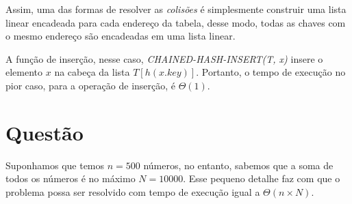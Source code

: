 \documentclass[a4paper,12pt]{article}
\begin{document}
Assim, uma das formas de resolver as \textit{colisões} é simplesmente construir uma lista linear encadeada para cada endereço da tabela, desse modo, todas as chaves com o mesmo endereço são encadeadas em uma lista linear.

A função de inserção, nesse caso, \textit{CHAINED-HASH-INSERT(T, x)} insere o elemento $x$ na cabeça da lista $T[h(x.key)]$. Portanto, o tempo de execução no pior caso, para a operação de inserção, é $\Theta(1)$.

\section{Questão}


Suponhamos que temos $n = 500$ números, no entanto, sabemos que a soma de todos os números é no máximo $N = 10000$. Esse pequeno detalhe faz com que o problema possa ser resolvido com tempo de execução igual a $\Theta(n\times N)$.
\end{document}

